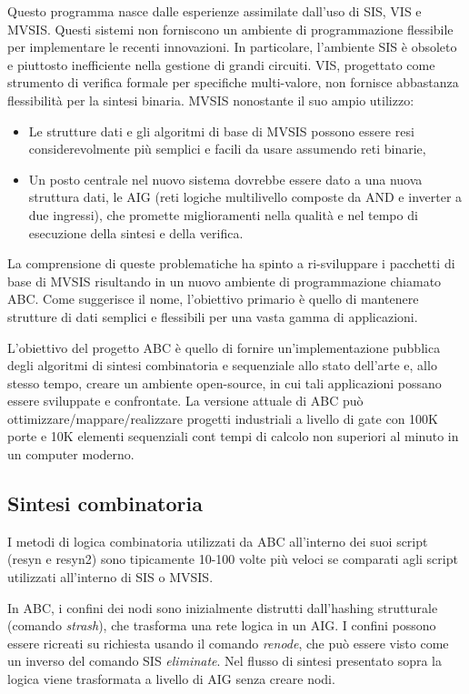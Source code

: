 \documentclass[
  italian,
]{book}
\providecommand{\tightlist}{%
  \setlength{\itemsep}{0pt}\setlength{\parskip}{0pt}}
\begin{document}
Questo programma nasce dalle esperienze assimilate dall'uso di SIS, VIS e MVSIS.
Questi sistemi non forniscono un ambiente di programmazione flessibile per implementare le recenti innovazioni. In particolare, l'ambiente SIS è obsoleto e piuttosto inefficiente nella gestione di grandi circuiti. VIS, progettato come strumento di verifica formale per specifiche multi-valore, non fornisce abbastanza flessibilità per la sintesi binaria. MVSIS nonostante il suo ampio utilizzo:

\begin{itemize}
\tightlist
\item
  Le strutture dati e gli algoritmi di base di MVSIS possono essere resi considerevolmente più semplici e facili da usare assumendo reti binarie,
\item
  Un posto centrale nel nuovo sistema dovrebbe essere dato a una nuova struttura dati, le AIG (reti logiche multilivello composte da AND e inverter a due ingressi), che promette miglioramenti nella qualità e nel tempo di esecuzione della sintesi e della verifica.
\end{itemize}

La comprensione di queste problematiche ha spinto a ri-sviluppare i pacchetti di base di MVSIS risultando in un nuovo ambiente di programmazione chiamato ABC. Come suggerisce il nome, l'obiettivo primario è quello di mantenere strutture di dati semplici e flessibili per una vasta gamma di applicazioni.

L'obiettivo del progetto ABC è quello di fornire un'implementazione pubblica degli algoritmi di sintesi combinatoria e sequenziale allo stato dell'arte e, allo stesso tempo, creare un ambiente open-source, in cui tali applicazioni possano essere sviluppate e confrontate. La versione attuale di ABC può ottimizzare/mappare/realizzare progetti industriali a livello di gate con 100K porte e 10K elementi sequenziali cont tempi di calcolo non superiori al minuto in un computer moderno.

\hypertarget{sintesi-combinatoria}{%
\subsection{Sintesi combinatoria}\label{sintesi-combinatoria}}

I metodi di logica combinatoria utilizzati da ABC all'interno dei suoi script (resyn e resyn2) sono tipicamente 10-100 volte più veloci se comparati agli script utilizzati all'interno di SIS o MVSIS.

In ABC, i confini dei nodi sono inizialmente distrutti dall'hashing strutturale (comando \emph{strash}), che trasforma una rete logica in un AIG. I confini possono essere ricreati su richiesta usando il comando \emph{renode}, che può essere visto come un inverso del comando SIS \emph{eliminate}. Nel flusso di sintesi presentato sopra la logica viene trasformata a livello di AIG senza creare nodi.
\end{document}
